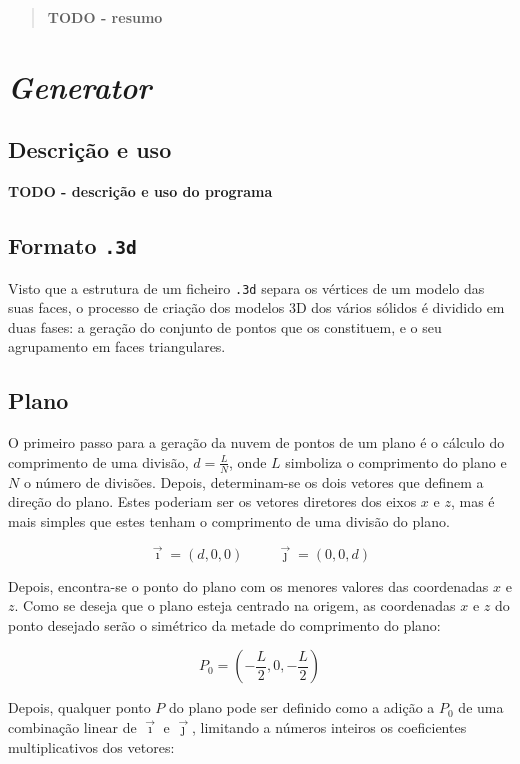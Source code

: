 \documentclass[12pt, a4paper]{article}
\begin{document}
\pagebreak

\begin{abstract}
    \textbf{\color{red} TODO - resumo}
\end{abstract}

\section{\emph{Generator}}

\subsection{Descrição e uso}

\textbf{\color{red} TODO - descrição e uso do programa}

\subsection{Formato \texttt{.3d}}

Visto que a estrutura de um ficheiro \texttt{.3d} separa os vértices de um modelo das suas faces, o
processo de criação dos modelos 3D dos vários sólidos é dividido em duas fases: a geração do
conjunto de pontos que os constituem, e o seu agrupamento em faces triangulares.

\subsection{Plano}

O primeiro passo para a geração da nuvem de pontos de um plano é o cálculo do comprimento de uma
divisão, $d = \frac{L}{N}$, onde $L$ simboliza o comprimento do plano e $N$ o número de divisões.
Depois, determinam-se os dois vetores que definem a direção do plano. Estes poderiam ser os vetores
diretores dos eixos $x$ e $z$, mas é mais simples que estes tenham o comprimento de uma divisão do
plano.

$$
\vec{\imath} = (d, 0, 0)
\hspace{1cm}
\vec{\jmath} = (0, 0, d)
$$

Depois, encontra-se o ponto do plano com os menores valores das coordenadas $x$ e $z$. Como se
deseja que o plano esteja centrado na origem, as coordenadas $x$ e $z$ do ponto desejado serão o
simétrico da metade do comprimento do plano:

$$
P_0 = \left ( - \frac{L}{2}, 0, - \frac{L}{2} \right )
$$

Depois, qualquer ponto $P$ do plano pode ser definido como a adição a $P_0$ de uma combinação linear
de $\vec{\imath}$ e $\vec{\jmath}$, limitando a números inteiros os coeficientes multiplicativos dos
vetores:
\end{document}
